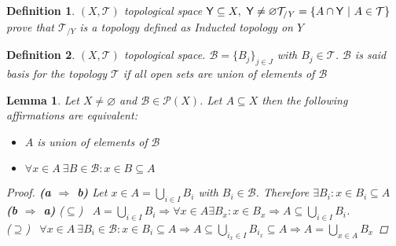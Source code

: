 \documentclass{article}
\newtheorem{definition}{Definition}
\newtheorem{lemma}{Lemma}
\begin{document}
    \begin{definition}
        $(X, \mathcal{T})$ topological space $\mathsf{Y} \subseteq X, \ \mathsf{Y} \neq \varnothing \\ \mathcal{T}_{/Y} = \{ A\cap \mathsf{Y} \ | \ A \in \mathcal{T} \}$ prove that $\mathcal{T}_{/Y}$ is a topology defined as Inducted topology on $Y$
    \end{definition}
    \begin{definition}
        $(X,\mathcal{T})$ topological space. $\mathcal{B} = \{ B_j\}_{j\in J}$ with $B_j \in \mathcal{T}$. $\mathcal{B}$ is said basis for the topology $\mathcal{T}$ if all open sets are union of elements of $\mathcal{B}$  
    \end{definition}
    \begin{lemma}
        Let $X \neq \varnothing$ and $\mathcal{B} \in \mathcal{P}(X)$. Let $A \subseteq X$ then the following affirmations are equivalent:
        \begin{itemize}
            \item[(a)] $A$ is union of elements of $\mathcal{B}$
            \item[(b)] $\forall x \in A \ \exists B \in \mathcal{B} : x\in B \subseteq A$ 
        \end{itemize}
        \begin{proof}
            \textbf{(a $\Rightarrow$ b)}
                Let $x \in A = \bigcup_{i \in I}B_i$ with $B_i \in \mathcal{B}$. Therefore $\exists B_i: x\in B_i \subseteq A$  \\
            \textbf{(b $\Rightarrow$ a)} 
                ($\subseteq$) \ $A = \bigcup_{i\in I} B_i \Rightarrow \forall x \in A \exists B_x : x\in B_x \Rightarrow A \subseteq \bigcup_{i\in I} B_i$. \\
                ($\supseteq$) \ $\forall x \in A \ \exists B_i \in \mathcal{B} : x\in B_i \subseteq A \Rightarrow A \subseteq \bigcup_{i_x\in I}B_{i_{x}}\subseteq A \Rightarrow A = \bigcup_{x\in A}B_x$
        \end{proof}
    \end{lemma}
\end{document}
